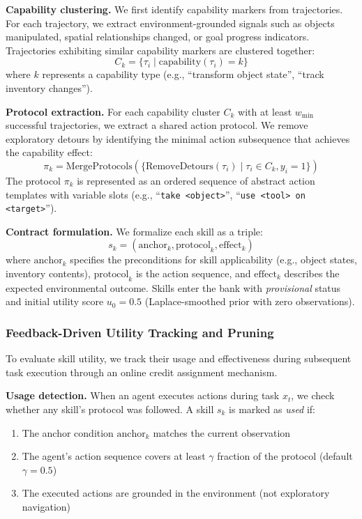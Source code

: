 \textbf{Capability clustering.} We first identify capability markers from trajectories. For each trajectory, we extract environment-grounded signals such as objects manipulated, spatial relationships changed, or goal progress indicators. Trajectories exhibiting similar capability markers are clustered together:
\begin{equation}
    C_k = \{\tau_i \mid \text{capability}(\tau_i) = k\}
\end{equation}
where $k$ represents a capability type (e.g., ``transform object state'', ``track inventory changes'').

\textbf{Protocol extraction.} For each capability cluster $C_k$ with at least $w_{\min}$ successful trajectories, we extract a shared action protocol. We remove exploratory detours by identifying the minimal action subsequence that achieves the capability effect:
\begin{equation}
    \pi_k = \text{MergeProtocols}(\{\text{RemoveDetours}(\tau_i) \mid \tau_i \in C_k, y_i = 1\})
\end{equation}
The protocol $\pi_k$ is represented as an ordered sequence of abstract action templates with variable slots (e.g., ``\texttt{take <object>}'', ``\texttt{use <tool> on <target>}'').

\textbf{Contract formulation.} We formalize each skill as a triple:
\begin{equation}
    s_k = (\text{anchor}_k, \text{protocol}_k, \text{effect}_k)
\end{equation}
where $\text{anchor}_k$ specifies the preconditions for skill applicability (e.g., object states, inventory contents), $\text{protocol}_k$ is the action sequence, and $\text{effect}_k$ describes the expected environmental outcome. Skills enter the bank with \emph{provisional} status and initial utility score $u_0 = 0.5$ (Laplace-smoothed prior with zero observations).

\subsubsection{Feedback-Driven Utility Tracking and Pruning}

To evaluate skill utility, we track their usage and effectiveness during subsequent task execution through an online credit assignment mechanism.

\textbf{Usage detection.} When an agent executes actions during task $x_t$, we check whether any skill's protocol was followed. A skill $s_k$ is marked as \emph{used} if:
\begin{enumerate}
    \item The anchor condition $\text{anchor}_k$ matches the current observation
    \item The agent's action sequence covers at least $\gamma$ fraction of the protocol (default $\gamma = 0.5$)
    \item The executed actions are grounded in the environment (not exploratory navigation)
\end{enumerate}

